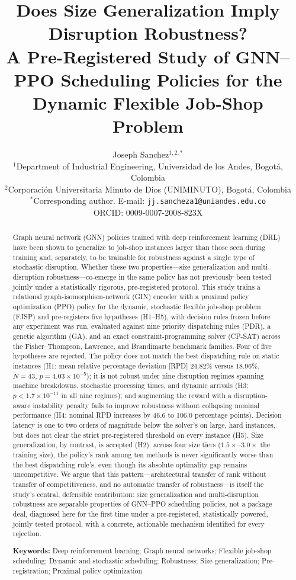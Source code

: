 \documentclass[11pt]{article}
\title{\bfseries Does Size Generalization Imply Disruption Robustness?\\
A Pre-Registered Study of GNN--PPO Scheduling Policies for the\\
Dynamic Flexible Job-Shop Problem}
\author{
  Joseph Sanchez$^{1,2,\ast}$ \\[4pt]
  \small $^{1}$Department of Industrial Engineering, Universidad de los Andes, Bogot\'a, Colombia \\
  \small $^{2}$Corporaci\'on Universitaria Minuto de Dios (UNIMINUTO), Bogot\'a, Colombia \\[4pt]
  \small $^{\ast}$Corresponding author. E-mail: \texttt{jj.sancheza1@uniandes.edu.co} \\
  \small ORCID: 0009-0007-2008-823X
}
\date{}
\begin{document}
\maketitle
\thispagestyle{empty}

\begin{abstract}
\noindent
Graph neural network (GNN) policies trained with deep reinforcement learning (DRL) have been shown to generalize to job-shop instances larger than those seen during training and, separately, to be trainable for robustness against a single type of stochastic disruption. Whether these two properties---size generalization and multi-disruption robustness---co-emerge in the same policy has not previously been tested jointly under a statistically rigorous, pre-registered protocol. This study trains a relational graph-isomorphism-network (GIN) encoder with a proximal policy optimization (PPO) policy for the dynamic, stochastic flexible job-shop problem (FJSP) and pre-registers five hypotheses (H1--H5), with decision rules frozen before any experiment was run, evaluated against nine priority dispatching rules (PDR), a genetic algorithm (GA), and an exact constraint-programming solver (CP-SAT) across the Fisher--Thompson, Lawrence, and Brandimarte benchmark families. Four of five hypotheses are rejected. The policy does not match the best dispatching rule on static instances (H1: mean relative percentage deviation [RPD] 24.82\% versus 18.96\%, $N=43$, $p=4.03\times10^{-5}$); it is not robust under nine disruption regimes spanning machine breakdowns, stochastic processing times, and dynamic arrivals (H3: $p<1.7\times10^{-11}$ in all nine regimes); and augmenting the reward with a disruption-aware instability penalty fails to improve robustness without collapsing nominal performance (H4: nominal RPD increases by 46.6 to 106.0 percentage points). Decision latency is one to two orders of magnitude below the solver's on large, hard instances, but does not clear the strict pre-registered threshold on every instance (H5). Size generalization, by contrast, is accepted (H2): across four size tiers ($1.5\times$--$3.0\times$ the training size), the policy's rank among ten methods is never significantly worse than the best dispatching rule's, even though its absolute optimality gap remains uncompetitive. We argue that this pattern---architectural transfer of rank without transfer of competitiveness, and no automatic transfer of robustness---is itself the study's central, defensible contribution: size generalization and multi-disruption robustness are separable properties of GNN--PPO scheduling policies, not a package deal, diagnosed here for the first time under a pre-registered, statistically powered, jointly tested protocol, with a concrete, actionable mechanism identified for every rejection.

\medskip
\noindent\textbf{Keywords:} Deep reinforcement learning; Graph neural networks; Flexible job-shop scheduling; Dynamic and stochastic scheduling; Robustness; Size generalization; Pre-registration; Proximal policy optimization
\end{abstract}
\end{document}
